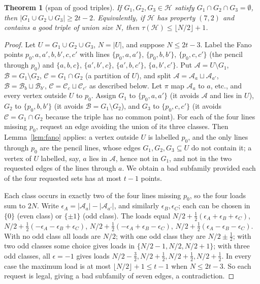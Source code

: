 \documentclass[11pt]{amsart}
\newtheorem{theorem}{Theorem}[section]
\theoremstyle{definition}
\theoremstyle{remark}
\newcommand{\cH}{\mathcal H}
\newcommand{\floor}[1]{\lfloor #1\rfloor}
\begin{document}
\begin{theorem}[span of good triples]\label{thm:GT}
If $G_1,G_2,G_3\in\cH$ satisfy $G_1\cap G_2\cap G_3=\emptyset$, then $|G_1\cup G_2\cup G_3|\ge2t-2$. Equivalently, if $\cH$ has property $(7,2)$ and contains a good triple of union size $N$, then $\tau(\cH)\le\floor{N/2}+1$.
\end{theorem}
\begin{proof}
Let $U=G_1\cup G_2\cup G_3$, $N=|U|$, and suppose $N\le2t-3$. Label the Fano points $p_0,a,a',b,b',c,c'$ with lines $\{p_0,a,a'\}$, $\{p_0,b,b'\}$, $\{p_0,c,c'\}$ (the pencil through $p_0$) and $\{a,b,c\}$, $\{a',b',c\}$, $\{a',b,c'\}$, $\{a,b',c'\}$. Put $\mathcal A=U\setminus G_1$, $\mathcal B=G_1\setminus G_2$, $\mathcal C=G_1\cap G_2$ (a partition of $U$), and split $\mathcal A=\mathcal A_a\sqcup\mathcal A_{a'}$, $\mathcal B=\mathcal B_b\sqcup\mathcal B_{b'}$, $\mathcal C=\mathcal C_c\sqcup\mathcal C_{c'}$ as described below. Let $\pi$ map $\mathcal A_a$ to $a$, etc., and every vertex outside $U$ to $p_0$. Assign $G_1$ to $\{p_0,a,a'\}$ (it avoids $\mathcal A$ and lies in $U$), $G_2$ to $\{p_0,b,b'\}$ (it avoids $\mathcal B=G_1\setminus G_2$), and $G_3$ to $\{p_0,c,c'\}$ (it avoids $\mathcal C=G_1\cap G_2$ because the triple has no common point). For each of the four lines missing $p_0$, request an edge avoiding the union of its three classes. Then Lemma~\ref{lem:fano} applies: a vertex outside $U$ is labelled $p_0$, and the only lines through $p_0$ are the pencil lines, whose edges $G_1,G_2,G_3\subseteq U$ do not contain it; a vertex of $U$ labelled, say, $a$ lies in $\mathcal A$, hence not in $G_1$, and not in the two requested edges of the lines through $a$. We obtain a bad subfamily provided each of the four requested sets has at most $t-1$ points.

Each class occurs in exactly two of the four lines missing $p_0$, so the four loads sum to $2N$. Write $\epsilon_A=|\mathcal A_a|-|\mathcal A_{a'}|$, and similarly $\epsilon_B,\epsilon_C$; each can be chosen in $\{0\}$ (even class) or $\{\pm1\}$ (odd class). The loads equal $N/2+\tfrac12(\epsilon_A+\epsilon_B+\epsilon_C)$, $N/2+\tfrac12(-\epsilon_A-\epsilon_B+\epsilon_C)$, $N/2+\tfrac12(-\epsilon_A+\epsilon_B-\epsilon_C)$, $N/2+\tfrac12(\epsilon_A-\epsilon_B-\epsilon_C)$. With no odd class all loads are $N/2$; with one odd class they are $N/2\pm\frac12$; with two odd classes some choice gives loads in $\{N/2-1,N/2,N/2+1\}$; with three odd classes, all $\epsilon=-1$ gives loads $N/2-\tfrac32,N/2+\tfrac12,N/2+\tfrac12,N/2+\tfrac12$. In every case the maximum load is at most $\floor{N/2}+1\le t-1$ when $N\le2t-3$. So each request is legal, giving a bad subfamily of seven edges, a contradiction.
\end{proof}
\end{document}
